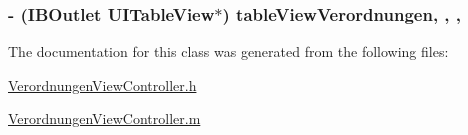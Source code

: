 \subsubsection[{table\+View\+Verordnungen}]{\setlength{\rightskip}{0pt plus 5cm}-\/ (I\+B\+Outlet U\+I\+Table\+View$\ast$) table\+View\+Verordnungen\hspace{0.3cm}{\ttfamily [read]}, {\ttfamily [write]}, {\ttfamily [nonatomic]}, {\ttfamily [weak]}}\label{interface_verordnungen_view_controller_ae01877c9a830e08c00ed79628be912d2}


The documentation for this class was generated from the following files\+:\begin{DoxyCompactItemize}
\item 
\hyperlink{_verordnungen_view_controller_8h}{Verordnungen\+View\+Controller.\+h}\item 
\hyperlink{_verordnungen_view_controller_8m}{Verordnungen\+View\+Controller.\+m}\end{DoxyCompactItemize}
